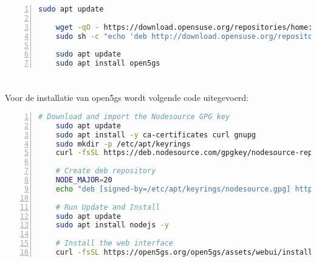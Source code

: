 
\begin{lstlisting}[basicstyle=\small, frame=single, breaklines=true, postbreak=\mbox{\textcolor{red}{$\hookrightarrow$}\space}, escapeinside ={\%,}, escapechar={!}, numbers=left, language=sh, caption=Installatie van Open5GS]
    sudo apt update

    wget -qO - https://download.opensuse.org/repositories/home:/acetcom:/open5gs:/latest/Debian_10/Release.key | sudo apt-key add -
    sudo sh -c "echo 'deb http://download.opensuse.org/repositories/home:/acetcom:/open5gs:/latest/Debian_10/ ./' > /etc/apt/sources.list.d/open5gs.list"
    
    sudo apt update
    sudo apt install open5gs
\end{lstlisting}

\section{}

Voor de installatie van \gls{open5gs} wordt volgende code uitegevoerd:

\begin{lstlisting}[basicstyle=\small, frame=single, breaklines=true, postbreak=\mbox{\textcolor{red}{$\hookrightarrow$}\space}, escapeinside ={\%,}, escapechar={!}, numbers=left, language=sh, caption=Installatie van web-interface]
    # Download and import the Nodesource GPG key
    sudo apt update
    sudo apt install -y ca-certificates curl gnupg
    sudo mkdir -p /etc/apt/keyrings
    curl -fsSL https://deb.nodesource.com/gpgkey/nodesource-repo.gpg.key | sudo gpg --dearmor -o /etc/apt/keyrings/nodesource.gpg
    
    # Create deb repository
    NODE_MAJOR=20
    echo "deb [signed-by=/etc/apt/keyrings/nodesource.gpg] https://deb.nodesource.com/node_$NODE_MAJOR.x nodistro main" | sudo tee /etc/apt/sources.list.d/nodesource.list
    
    # Run Update and Install
    sudo apt update
    sudo apt install nodejs -y

    # Install the web interface
    curl -fsSL https://open5gs.org/open5gs/assets/webui/install | sudo -E bash -
\end{lstlisting}

